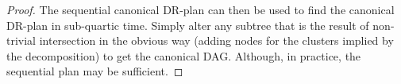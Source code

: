 \begin{proof}
    The sequential canonical DR-plan can then be used to find the canonical DR-plan in
    sub-quartic
    time. Simply alter any subtree that is the result of non-trivial intersection in the obvious way (adding nodes for the clusters implied by the decomposition) to get the canonical DAG. Although, in practice, the sequential plan may be sufficient.
\end{proof}









